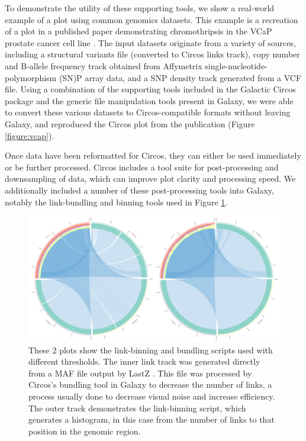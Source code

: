 To demonstrate the utility of these supporting tools, we show a real-world example of a plot using common genomics datasets. This example is a recreation of a plot in a published paper demonstrating chromothripsis in the VCaP prostate cancer cell line \cite{alves2013gene}. The input datasets originate from a variety of sources, including a structural variants file (converted to Circos links track), copy number and B-allele frequency track obtained from Affymetrix single-nucleotide-polymorphism (SN)P array data, and a SNP density track generated from a VCF file. Using a combination of the supporting tools included in the Galactic Circos package and the generic file manipulation tools present in Galaxy, we were able to convert these various datasets to Circos-compatible formats without leaving Galaxy, and reproduced the Circos plot from the publication (Figure \ref{figure:vcap}).

Once data have been reformatted for Circos, they can either be used immediately or be further processed. Circos includes a tool suite for post-processing and downsampling of data, which can improve plot clarity and processing speed. We additionally included a number of these post-processing tools into Galaxy, notably the link-bundling and binning tools used in Figure \ref{figure:binning-bundling}.

\begin{figure}[h!]
\centering
\includegraphics[width=\linewidth]{chapters/images/circos/binning-bundling.png}
\caption{These 2 plots show the link-binning and bundling scripts used with different thresholds. The inner link track was generated directly from a MAF file output by LastZ \cite{rahmani2011lastz}. This file was processed by Circos's bundling tool in Galaxy to decrease the number of links, a process usually done to decrease visual noise and increase efficiency. The outer track demonstrates the link-binning script, which generates a histogram, in this case from the number of links to that position in the genomic region.}
\label{figure:binning-bundling}
\end{figure}


